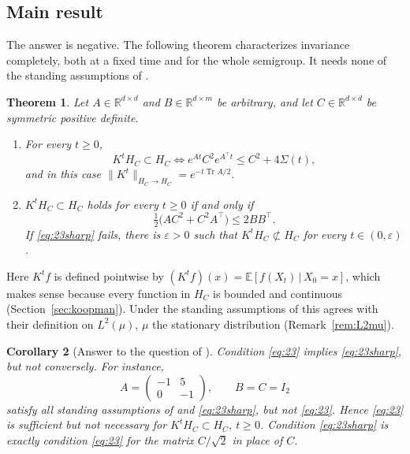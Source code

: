 \documentclass[11pt]{amsart}
\numberwithin{equation}{section}
\newtheorem{theorem}{Theorem}[section]
\newtheorem{corollary}[theorem]{Corollary}
\theoremstyle{definition}
\theoremstyle{remark}
\newcommand{\R}{\mathbb{R}}
\newcommand{\Tr}{\operatorname{Tr}}
\newcommand{\tp}{\top}
\begin{document}
\subsection*{Main result}
The answer is negative. The following theorem characterizes invariance completely, both at a fixed time and for
the whole semigroup. It needs none of the standing assumptions of \cite{PSWPN}.

\begin{theorem}\label{thm:main}
Let $A\in\R^{d\times d}$ and $B\in\R^{d\times m}$ be arbitrary, and let $C\in\R^{d\times d}$ be symmetric positive
definite.
\begin{enumerate}
\item[(a)] For every $t\ge0$,
\begin{equation}\label{eq:critA}
K^tH_C\subset H_C\iff e^{At}C^2e^{A^\tp t}\le C^2+4\Sigma(t),
\end{equation}
and in this case $\|K^t\|_{H_C\to H_C}=e^{-t\Tr A/2}$.
\item[(b)] $K^tH_C\subset H_C$ holds for every $t\ge0$ if and only if
\begin{equation}\label{eq:23sharp}
\tfrac12\bigl(AC^2+C^2A^\tp\bigr)\le 2BB^\tp .
\end{equation}
If \eqref{eq:23sharp} fails, there is $\varepsilon>0$ such that $K^tH_C\not\subset H_C$ for every
$t\in(0,\varepsilon)$.
\end{enumerate}
\end{theorem}

Here $K^tf$ is defined pointwise by $(K^tf)(x)=\mathbb E[f(X_t)\,|\,X_0=x]$, which makes sense because every
function in $H_C$ is bounded and continuous (Section~\ref{sec:koopman}). Under the standing assumptions of \cite{PSWPN} this agrees with their definition on
$L^2(\mu)$, $\mu$ the stationary distribution (Remark~\ref{rem:L2mu}).

\begin{corollary}[Answer to the question of \cite{PSWPN}]\label{cor:answer}
Condition \eqref{eq:23} implies \eqref{eq:23sharp}, but not conversely. For instance,
\[
A=\begin{pmatrix}-1&5\\0&-1\end{pmatrix},\qquad B=C=I_2
\]
satisfy all standing assumptions of \cite{PSWPN} and \eqref{eq:23sharp}, but not \eqref{eq:23}. Hence \eqref{eq:23} is
sufficient but not necessary for $K^tH_C\subset H_C$, $t\ge0$. Condition \eqref{eq:23sharp} is exactly
condition \eqref{eq:23} for the matrix $C/\sqrt2$ in place of $C$.
\end{corollary}
\end{document}
